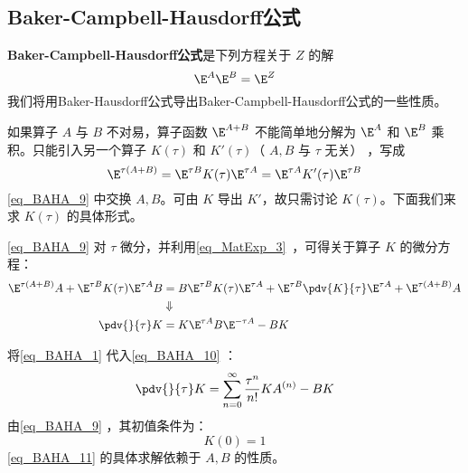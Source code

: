 \subsection{Baker-Campbell-Hausdorff公式}
\textbf{Baker-Campbell-Hausdorff公式}是下列方程关于 $Z$ 的解
\begin{equation}
\E^{A}\E^{B}=\E^{Z}
\end{equation}
我们将用Baker-Hausdorff公式导出Baker-Campbell-Hausdorff公式的一些性质。

如果算子 $A$ 与 $B$ 不对易，算子函数 $\E^{A+B}$ 不能简单地分解为  $\E^{A}$ 和 $\E^{B}$ 乘积。只能引入另一个算子 $K(\tau)$ 和 $K'(\tau)$（ $A,B$ 与 $\tau$ 无关） ，写成
\begin{equation}\label{eq_BAHA_9}
\E^{\tau(A+B)}=\E^{\tau B}K(\tau)\E^{\tau A}=\E^{\tau A}K'(\tau)\E^{\tau B}
\end{equation}
\autoref{eq_BAHA_9} 中交换 $A,B$。可由 $K$ 导出 $K'$，故只需讨论 $K(\tau)$。下面我们来求 $K(\tau)$ 的具体形式。

\autoref{eq_BAHA_9} 对 $\tau$ 微分，并利用\autoref{eq_MatExp_3}~，可得关于算子 $K$ 的微分方程：
\begin{equation}\label{eq_BAHA_10}
\begin{aligned}
\E^{\tau(A+B)}A+\E^{\tau B}K(\tau)\E^{\tau A}B&=B\E^{\tau B}K(\tau)\E^{\tau A}+\E^{\tau B}\pdv{K}{\tau}\E^{\tau A}+\E^{\tau(A+B)}A\\
&\Downarrow\\
\pdv{}{\tau}K&=K\E^{\tau A}B\E^{-\tau A}-BK
\end{aligned}
\end{equation}

将\autoref{eq_BAHA_1} 代入\autoref{eq_BAHA_10} ：
\begin{equation}\label{eq_BAHA_11}
\pdv{}{\tau}K=\sum_{n=0}^{\infty}\frac{\tau^n}{n!}KA^{(n)}-BK
\end{equation}
由\autoref{eq_BAHA_9} ，其初值条件为：
\begin{equation}
K(0)=1
\end{equation}
\autoref{eq_BAHA_11} 的具体求解依赖于 $A,B$ 的性质。

